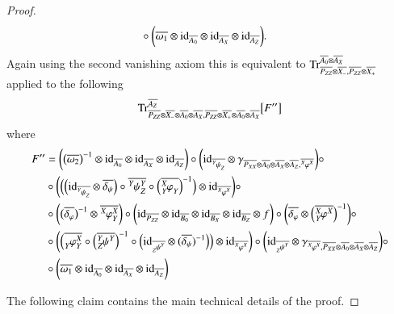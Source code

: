 \documentclass{amsart}
\def\tn{\textnormal}
\def\Trace{\tn{Tr}}
\def\ol{\overline}
\def\id{\tn{id}}
\newcommand{\inp}[1]{{#1_-}}
\newcommand{\outp}[1]{{#1_+}}
\newcommand{\feeddd}[3]{{\tensor*[^{#2}_{\color{white}{!}}]{{#1}}{^{#3}}}}%
\newcommand{\feeddc}[3]{{\tensor*[^{#2}]{{#1}}{_{#3}}}}
\newcommand{\feedcd}[3]{{\tensor*[_{#2}]{{#1}}{^{#3}}}}
\newcommand{\feedda}[3]{{\tensor*[^{#2}_{\color{white}{!}}]{{#1}}{^{#2}_{#3}}}}
\newcommand{\feedca}[3]{{\tensor*[_{#2}]{{#1}}{_{#2}^{#3}}}}
\newcommand{\feedad}[3]{{\tensor*[^{#2}_{#3}]{{#1}}{^{#2}}}}
\newcommand{\feedac}[3]{{\tensor*[_{#2}^{#3}]{{#1}}{_{#2}}}}
\theoremstyle{remark}
\theoremstyle{definition}
\begin{document}
\begin{proof}
\begin{align*}
&\circ\bigg(\ol{\omega_1}\otimes\id_{\ol{A_0}}\otimes\id_{\ol{A_X}}\otimes\id_{\ol{A_Z}}\bigg).
\end{align*}
Again using the second vanishing axiom this is equivalent to $\Trace^{\ol{A_0}\otimes\ol{A_X}}_{\ol{P_{ZZ}}\otimes\ol{\inp{X}},\ol{P_{ZZ}}\otimes\ol{\outp{X}}}$ applied to the following
\begin{align*}
\Trace^{\ol{A_Z}}_{\ol{P_{ZZ}}\otimes\ol{\inp{X}}\otimes\ol{A_0}\otimes\ol{A_X},\ol{P_{ZZ}}\otimes\ol{\outp{X}}\otimes\ol{A_0}\otimes\ol{A_X}}\big[F''\big]
\end{align*}
where
\begin{align*}
F''
&=\bigg(\big(\ol{\omega_2}\big)^{-1}\otimes\id_{\ol{A_0}}\otimes\id_{\ol{A_X}}\otimes\id_{\ol{A_Z}}\bigg)\circ\bigg(\id_{\ol{\feeddc{\psi}{Y}{Z}}}\otimes\gamma_{\ol{P_{XX}}\otimes\ol{A_0}\otimes\ol{A_X}\otimes\ol{A_Z},\ol{\feeddd{\varphi}{X}{X}}}\bigg)\circ\\
&\circ\bigg(\Big(\Big(\id_{\ol{\feeddc{\psi}{Y}{Z}}}\otimes\ol{\delta_\psi}\Big)\circ\ol{\feedda{\psi}{Y}{Z}}\circ\Big(\ol{\feedac{\varphi}{Y}{X}}\Big)^{-1}\Big)\otimes\id_{\ol{\feeddd{\varphi}{X}{X}}}\bigg)\circ\\
&\circ\bigg(\big(\ol{\delta_\varphi}\big)^{-1}\otimes\ol{\feedda{\varphi}{X}{Y}}\bigg)\circ\bigg(\id_{\ol{P_{ZZ}}}\otimes\id_{\ol{B_0}}\otimes\id_{\ol{B_X}}\otimes\id_{\ol{B_Z}}\otimes f\bigg)\circ\bigg(\ol{\delta_\varphi}\otimes\Big(\ol{\feedad{\varphi}{X}{Y}}\Big)^{-1}\bigg)\circ\\
&\circ\bigg(\Big(\ol{\feedca{\varphi}{Y}{X}}\circ\Big(\ol{\feedad{\psi}{Y}{Z}}\Big)^{-1}\circ\Big(\id_{\ol{\feedcd{\psi}{Z}{Y}}}\otimes(\ol{\delta_\psi})^{-1}\Big)\Big)\otimes\id_{\ol{\feeddd{\varphi}{X}{X}}}\bigg)\circ\bigg(\id_{\ol{\feedcd{\psi}{Z}{Y}}}\otimes\gamma_{\ol{\feeddd{\varphi}{X}{X}},\ol{P_{XX}}\otimes\ol{A_0}\otimes\ol{A_X}\otimes\ol{A_Z}}\bigg)\circ\\
&\circ\bigg(\ol{\omega_1}\otimes\id_{\ol{A_0}}\otimes\id_{\ol{A_X}}\otimes\id_{\ol{A_Z}}\bigg)\\
\end{align*}


The following claim contains the main technical details of the proof.


\end{proof}
\end{document}

